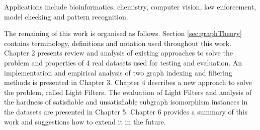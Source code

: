 \documentclass{l4proj}
\begin{document}
Applications include bioinformatics\cite{Bonnici:2013}, chemistry\cite{Regin:1995}, computer vision\cite{Damiand:2011,Solnon:2015}, law enforcement\cite{Coffman:2004}, model checking\cite{Calder:2015} and pattern recognition\cite{Conte:2004}.
        
        

The remaining of this work is organised as follows. Section \ref{sec:graphTheory} contains terminology, definitions and notation used throughout this work. Chapter 2 presents review and analysis of existing approaches to solve the problem and properties of 4 real datasets used for testing and evaluation. An implementation and empirical analysis of two graph indexing and filtering methods is presented in Chapter 3. Chapter 4 describes a new approach to solve the problem, called Light Filters. The evaluation of Light Filters and analysis of the hardness of satisfiable and unsatisfiable subgraph isomorphism instances in the datasets are presented in Chapter 5. Chapter 6 provides a summary of this work and suggestions how to extend it in the future. 
\end{document}
